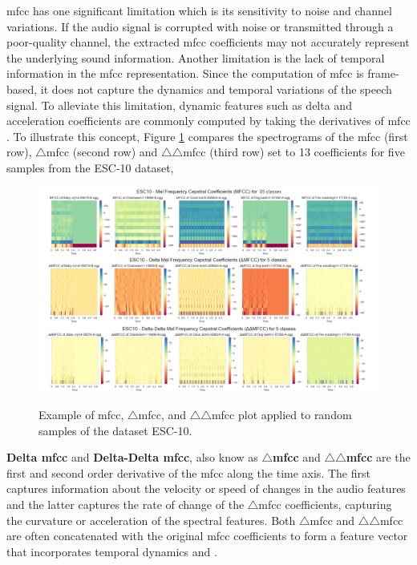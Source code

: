 \gls{mfcc} has one significant limitation which is its sensitivity to noise and channel variations. If the audio signal is corrupted with noise or transmitted through a poor-quality channel, the extracted \gls{mfcc} coefficients may not accurately represent the underlying sound information. Another limitation is the lack of temporal information in the \gls{mfcc} representation. Since the computation of \gls{mfcc} is frame-based, it does not capture the dynamics and temporal variations of the speech signal. To alleviate this limitation, dynamic features such as delta and acceleration coefficients are commonly computed by taking the derivatives of \gls{mfcc} \cite{Gold2011}. To illustrate this concept, Figure \ref{fig:frmwk_spectral_features_mfcc} compares the spectrograms of the \gls{mfcc} (first row), $\triangle$\gls{mfcc} (second row) and $\triangle\triangle$\gls{mfcc} (third row) set to 13 coefficients for five samples from the ESC-10 dataset, 

\begin{figure}[htbp]
    \raggedright
        \caption{Example of \gls{mfcc}, $\triangle$\gls{mfcc}, and $\triangle\triangle$\gls{mfcc} plot applied to random samples of the dataset ESC-10.}
        \includegraphics[width=1.0\textwidth]{resources/images/030-theoretical_framework/Framework_spectral_features_mfcc.png}
        \label{fig:frmwk_spectral_features_mfcc}
\end{figure}

\textbf{Delta \gls{mfcc}} and \textbf{Delta-Delta \gls{mfcc}}, also know as \textbf{$\triangle$\gls{mfcc}} and \textbf{$\triangle\triangle$\gls{mfcc}} are the first and second order derivative of the \gls{mfcc} along the time axis.%
The first captures information about the velocity or speed of changes in the audio features and the latter captures the rate of change of the $\triangle$\gls{mfcc} coefficients, capturing the curvature or acceleration of the spectral features. Both $\triangle$\gls{mfcc} and $\triangle\triangle$\gls{mfcc} are often concatenated with the original \gls{mfcc} coefficients to form a feature vector that incorporates temporal dynamics \cite{Bountourakis2019} and \cite{Tang2018}. 


